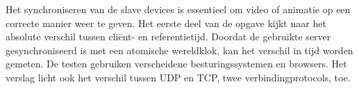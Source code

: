 Het synchroniseren van de slave devices is essentieel om video of animatie op een correcte manier weer te geven. Het eerste deel van de opgave kijkt naar het absolute verschil tussen cliënt- en referentietijd. Doordat de gebruikte server gesynchroniseerd is met een atomische wereldklok, kan het verschil in tijd worden gemeten. De testen gebruiken verscheidene besturingssystemen en browsers. Het verslag licht ook het verschil tussen UDP en TCP, twee verbindingprotocols, toe.